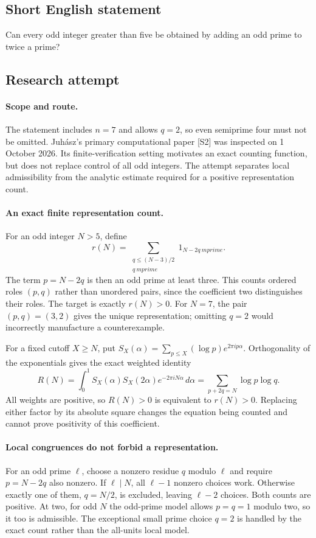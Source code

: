 \documentclass[11pt,a4paper]{article}
\begin{document}
\subsection{Short English statement}

Can every odd integer greater than five be obtained by adding an odd prime to twice a prime?

\subsection{Research attempt}

\paragraph{Scope and route.}
The statement includes $n=7$ and allows $q=2$, so even semiprime four
must not be omitted. Juh\'asz's primary computational paper [S2] was
inspected on 1 October 2026. Its finite-verification setting motivates
an exact counting function, but does not replace control of all odd
integers. The attempt separates local admissibility from the analytic
estimate required for a positive representation count.

\paragraph{An exact finite representation count.}
For an odd integer $N>5$, define
\[
 r(N)=\sum_{\substack{q\le(N-3)/2\\q\ {
m prime}}}
                 1_{N-2q\ {
m prime}}.
\]
The term $p=N-2q$ is then an odd prime at least three. This counts
ordered roles $(p,q)$ rather than unordered pairs, since the coefficient
two distinguishes their roles. The target is exactly $r(N)>0$.
For $N=7$, the pair $(p,q)=(3,2)$ gives the unique representation;
omitting $q=2$ would incorrectly manufacture a counterexample.

For a fixed cutoff $X\ge N$, put
$S_X(\alpha)=\sum_{p\le X}(\log p)e^{2\pi i p\alpha}$.
Orthogonality of the exponentials gives the exact weighted identity
\[
 R(N)=\int_0^1S_X(\alpha)S_X(2\alpha)e^{-2\pi iN\alpha}\,d\alpha
     =\sum_{p+2q=N}\log p\log q.
\]
All weights are positive, so $R(N)>0$ is equivalent to $r(N)>0$.
Replacing either factor by its absolute square changes the equation
being counted and cannot prove positivity of this coefficient.

\paragraph{Local congruences do not forbid a representation.}
For an odd prime $\ell$, choose a nonzero residue $q$ modulo $\ell$
and require $p=N-2q$ also nonzero. If $\ell\mid N$, all $\ell-1$
nonzero choices work. Otherwise exactly one of them, $q=N/2$, is
excluded, leaving $\ell-2$ choices. Both counts are positive. At two,
for odd $N$ the odd-prime model allows $p=q=1$ modulo two, so it too
is admissible. The exceptional small prime choice $q=2$ is handled
by the exact count rather than the all-units local model.
\end{document}
